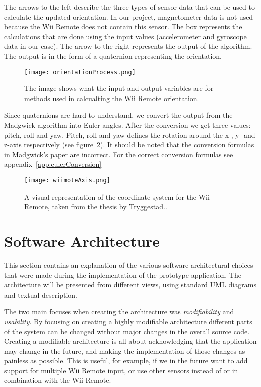The arrows to the left describe the three types of sensor data that can be used to calculate the updated orientation. In our project, magnetometer data is not used because the Wii Remote does not contain this sensor. The box represents the calculations that are done using the input values (accelerometer and gyroscope data in our case). The arrow to the right represents the output of the algorithm. The output is in the form of a quaternion representing the orientation.

\begin{figure}[h!]
  \centering
    \texttt{[image: orientationProcess.png]}
    \caption{\footnotesize The image shows what the input and output variables are for methods used in calcualting the Wii Remote orientation.}
    \label{fig:orientationProcess}
\end{figure}

Since quaternions are hard to understand, we convert the output from the Madgwick algorithm into Euler angles. After the conversion we get three values: pitch, roll and yaw. Pitch, roll and yaw defines the rotation around the x-, y- and z-axis respectively (see figure~\ref{fig:wiiAxis}). It should be noted that the conversion formulas in Madgwick’s paper \cite{madgwick} are incorrect. For the correct conversion formulas see appendix~\ref{app:eulerConversion}

\begin{figure}[h!]
  \centering
    \texttt{[image: wiimoteAxis.png]}
    \caption{\footnotesize A visual representation of the coordinate system for the Wii Remote, taken from the thesis by Tryggestad.\cite{Tryggestad}.}
    \label{fig:wiiAxis}
\end{figure}

\section{Software Architecture}
This section contains an explanation of the various software architectural choices that were made during the implementation of the prototype application. The architecture will be presented from different views, using standard UML diagrams and textual description.

The two main focuses when creating the architecture was \emph{modifiability} and \emph{usability}. By focusing on creating a highly modifiable architecture different parts of the system can be changed without major changes in the overall source code. Creating a modifiable architecture is all about acknowledging that the application may change in the future, and  making the implementation of those changes as painless as possible. This is useful, for example, if we in the future want to add support for multiple Wii Remote input, or use other sensors instead of or in combination with the Wii Remote.

